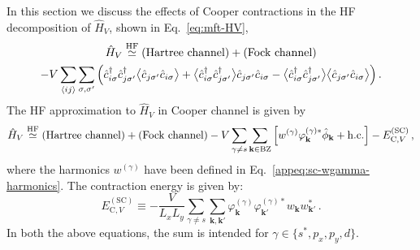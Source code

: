 In this section we discuss the effects of Cooper contractions in the HF decomposition of $\hat H_V$, shown in Eq.~\eqref{eq:mft-HV},
\begin{multline*}
	\hat H_V \HFsimeq
	(\text{Hartree channel}) + (\text{Fock channel}) \\
	-V \sum_{\ev{ij}} \sum_{\sigma,\sigma'} \Big(
	\hat c_{i\sigma}^\dagger \hat c_{j\sigma'}^\dagger \big\langle \hat c_{j\sigma'} \hat c_{i\sigma} \big\rangle + \big\langle \hat c_{i\sigma}^\dagger \hat c_{j\sigma'}^\dagger \big\rangle \hat c_{j\sigma'} \hat c_{i\sigma} - \big\langle \hat c_{i\sigma}^\dagger \hat c_{j\sigma'}^\dagger \big\rangle  \big\langle \hat c_{j\sigma'} \hat c_{i\sigma} \big\rangle \Big) \, .
\end{multline*}
The HF approximation to $\hat H_V$ in Cooper channel is given by
\begin{equation}\label{eq:sc-HV-cooper-approx}
	\hat H_V \stackrel{\mathrm{HF}}{\simeq} \text{(Hartree channel)} + (\text{Fock channel})
	-V \sum_{\gamma\neq s} \sum_{\mathbf{k}\in\mathrm{BZ}}
	\left[
	w^{(\gamma)} \varphi_\mathbf{k}^{(\gamma)*} \hat \phi_\mathbf{k} + \mathrm{h.c.} 
	\right] - E_{\mathrm{C},V}^{(\mathrm{SC})} \, ,
\end{equation}
where the harmonics $w^{(\gamma)}$ have been defined in Eq.~\eqref{appeq:sc-wgamma-harmonics}. The contraction energy is given by:
\begin{equation}\label{eq:sc-HV-cooper-Ec-implicit}
	E_{\mathrm{C},V}^{(\mathrm{SC})} \equiv - \frac{V}{L_x L_y} \sum_{\gamma\neq s} \sum_{\mathbf{k}, \mathbf{k}'}  \varphi_\mathbf{k}^{(\gamma)} \varphi_{\mathbf{k}'}^{(\gamma)*} w_\mathbf{k} w_{\mathbf{k}'}^* \, .
\end{equation}
In both the above equations, the sum is intended for $\gamma \in \lbrace s^*, p_x, p_y, d \rbrace$.

